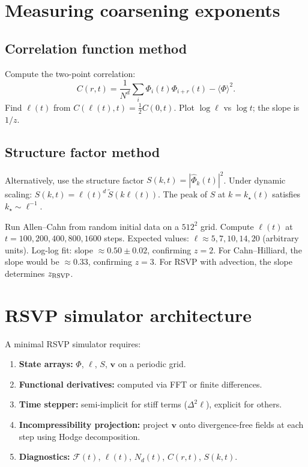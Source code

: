 \section{Measuring coarsening exponents}

\subsection*{Correlation function method}

Compute the two-point correlation:
\[
  C(r, t) = \frac{1}{N^d}\sum_{i}
  \Phi_i(t)\Phi_{i+r}(t) - \langle\Phi\rangle^2.
\]
Find $\ell(t)$ from $C(\ell(t),t) = \frac{1}{2}C(0,t)$.
Plot $\log\ell$ vs $\log t$; the slope is $1/z$.

\subsection*{Structure factor method}

Alternatively, use the structure factor
$S(k,t) = |\hat\Phi_k(t)|^2$.
Under dynamic scaling: $S(k,t) = \ell(t)^d\,\tilde{S}(k\ell(t))$.
The peak of $S$ at $k = k_\star(t)$ satisfies $k_\star \sim \ell^{-1}$.

\begin{WorkedExample}
  Run Allen--Cahn from random initial data on a $512^2$ grid.
  Compute $\ell(t)$ at $t = 100, 200, 400, 800, 1600$ steps.
  Expected values: $\ell \approx 5, 7, 10, 14, 20$ (arbitrary units).
  Log-log fit: slope $\approx 0.50 \pm 0.02$, confirming $z = 2$.
  For Cahn--Hilliard, the slope would be $\approx 0.33$, confirming $z = 3$.
  For RSVP with advection, the slope determines $z_{\rm RSVP}$.
\end{WorkedExample}

\section{RSVP simulator architecture}

A minimal RSVP simulator requires:

\begin{enumerate}[leftmargin=2em]
  \item \textbf{State arrays:} $\Phi$, $\ell$, $S$, $\mathbf{v}$
    on a periodic grid.
  \item \textbf{Functional derivatives:} computed via FFT or
    finite differences.
  \item \textbf{Time stepper:} semi-implicit for stiff terms
    ($\Delta^2\ell$), explicit for others.
  \item \textbf{Incompressibility projection:} project
    $\mathbf{v}$ onto divergence-free fields at each step
    using Hodge decomposition.
  \item \textbf{Diagnostics:} $\mathcal{F}(t)$, $\ell(t)$,
    $N_d(t)$, $C(r,t)$, $S(k,t)$.
\end{enumerate}

